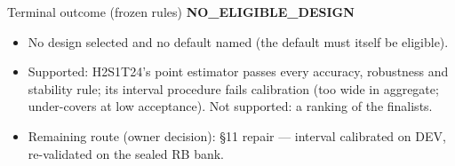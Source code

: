 \documentclass[aspectratio=169,10pt]{beamer}
\def\evidencetext{}
\begin{document}
\gdef\evidencetext{\texttt{results/final/coverage\_dev/decision\_final.json}; \texttt{DECISION\_RECORD-pet-final-design.md}}
\begin{frame}{Terminal outcome (frozen rules)}
\centering\Large\textbf{NO\_ELIGIBLE\_DESIGN}\par{}\raggedright\par\vspace{0.3cm}\small\begin{itemize}\item No design selected and no default named (the default must itself be eligible).\item Supported: H2S1T24's point estimator passes every accuracy, robustness and stability rule; its interval procedure fails calibration (too wide in aggregate; under-covers at low acceptance). Not supported: a ranking of the finalists.\item Remaining route (owner decision): \S11 repair --- interval calibrated on DEV, re-validated on the sealed RB bank.\end{itemize}
\end{frame}
\end{document}
